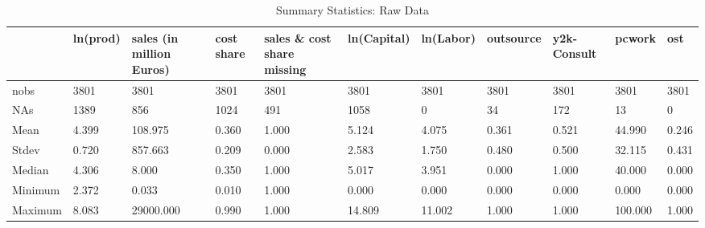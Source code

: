 \begin{table}[ht]
\centering
\caption{Summary Statistics: Raw Data} 
\begin{tabular}{p{2cm}|p{2cm}p{2cm}p{2cm}p{2cm}p{2cm}p{2cm}p{2cm}p{}p{}p{}}
  \hline
 & ln(prod) & sales (in million Euros) & cost share & sales \& cost share missing & ln(Capital) & ln(Labor) & outsource & y2k-Consult & pcwork & ost \\ 
  \hline
nobs & 3801 & 3801 & 3801 & 3801 & 3801 & 3801 & 3801 & 3801 & 3801 & 3801 \\ 
  NAs & 1389 & 856 & 1024 & 491 & 1058 & 0 & 34 & 172 & 13 & 0 \\ 
  Mean & 4.399 & 108.975 & 0.360 & 1.000 & 5.124 & 4.075 & 0.361 & 0.521 & 44.990 & 0.246 \\ 
  Stdev & 0.720 & 857.663 & 0.209 & 0.000 & 2.583 & 1.750 & 0.480 & 0.500 & 32.115 & 0.431 \\ 
  Median & 4.306 & 8.000 & 0.350 & 1.000 & 5.017 & 3.951 & 0.000 & 1.000 & 40.000 & 0.000 \\ 
  Minimum & 2.372 & 0.033 & 0.010 & 1.000 & 0.000 & 0.000 & 0.000 & 0.000 & 0.000 & 0.000 \\ 
  Maximum & 8.083 & 29000.000 & 0.990 & 1.000 & 14.809 & 11.002 & 1.000 & 1.000 & 100.000 & 1.000 \\ 
   \hline
\end{tabular}
\end{table}
